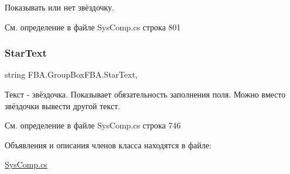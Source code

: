 Показывать или нет звёздочку. 



См. определение в файле Sys\+Comp.\+cs строка 801

\mbox{\label{class_f_b_a_1_1_group_box_f_b_a_aaf77782150fa846197306924fa379d83}} 
\subsubsection{\texorpdfstring{Star\+Text}{StarText}}
{\footnotesize\ttfamily string F\+B\+A.\+Group\+Box\+F\+B\+A.\+Star\+Text\hspace{0.3cm}{\ttfamily [get]}, {\ttfamily [set]}}



Текст -\/ звёздочка. Показывает обязательность заполнения поля. Можно вместо звёздочки вывести другой текст. 



См. определение в файле Sys\+Comp.\+cs строка 746



Объявления и описания членов класса находятся в файле\+:\begin{DoxyCompactItemize}
\item 
\mbox{\hyperlink{_sys_comp_8cs}{Sys\+Comp.\+cs}}\end{DoxyCompactItemize}

